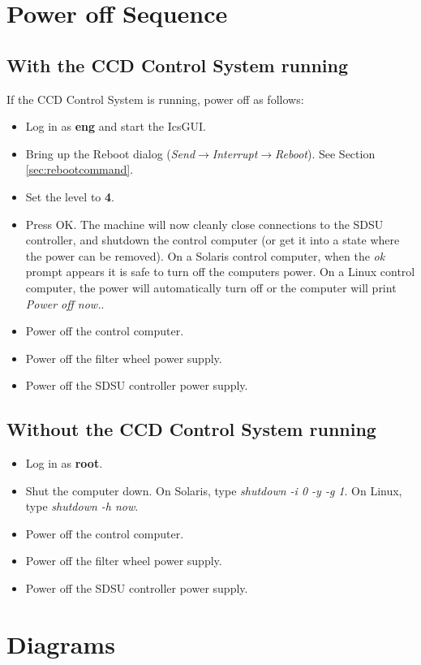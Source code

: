 \documentclass[10pt,a4paper]{article}
\begin{document}
\section{Power off Sequence}
\subsection{With the CCD Control System running}
If the CCD Control System is running, power off as follows:
\begin{itemize}
\item Log in as {\bf eng} and start the IcsGUI.
\item Bring up the Reboot dialog ({\em Send$\rightarrow$Interrupt$\rightarrow$Reboot}). 
	See Section \ref{sec:rebootcommand}.
\item Set the level to {\bf 4}.
\item Press OK. The machine will now cleanly close connections to the SDSU controller, and
	shutdown the control computer (or get it into a state where the power can be removed).
	On a Solaris control computer, when the {\em ok} prompt appears it is safe to turn off the computers power.
	On a Linux control computer, the power will automatically turn off or the computer will print
	{\em Power off now.}.
\item Power off the control computer.
\item Power off the filter wheel power supply.
\item Power off the SDSU controller power supply.
\end{itemize}

\subsection{Without the CCD Control System running}
\begin{itemize}
\item Log in as {\bf root}.
\item Shut the computer down. On Solaris, type {\em shutdown -i 0 -y -g 1}. On Linux, type {\em shutdown -h now}.
\item Power off the control computer.
\item Power off the filter wheel power supply.
\item Power off the SDSU controller power supply.
\end{itemize}

\section{Diagrams}
\end{document}
